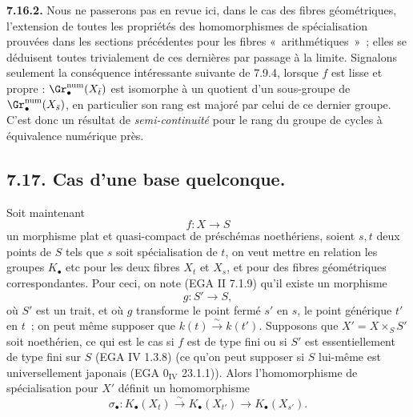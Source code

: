 
\textbf{7.16.2.}
Nous ne passerons pas en revue ici, dans le cas des fibres géométriques, l'extension de toutes les propriétés des homomorphismes de spécialisation prouvées dans les sections précédentes pour les fibres «~arithmétiques~»~; elles se déduisent toutes trivialement de ces dernières par passage à la limite. Signalons seulement la conséquence intéressante suivante de 7.9.4, lorsque \(f\) est lisse et propre : \(\Gr_\bullet^{\mathrm{num}}(X_{\bar t})\) est isomorphe à un quotient d'un sous-groupe de \(\Gr_\bullet^{\mathrm{num}}(X_{\bar s})\), en particulier son rang est majoré par celui de ce dernier groupe. C'est donc un résultat de \emph{semi-continuité} pour le rang du groupe de cycles à équivalence numérique près.

\subsection*{7.17. Cas d'une base quelconque.}
Soit maintenant
\[
  f:X\longrightarrow S
\]
un morphisme plat et quasi-compact de préschémas noethériens, soient \(s,t\) deux points de \(S\) tels que \(s\) soit spécialisation de \(t\), on veut mettre en relation les groupes \(K_\bullet\) etc pour les deux fibres \(X_t\) et \(X_s\), et pour des fibres géométriques correspondantes. Pour ceci, on note (EGA II 7.1.9) qu'il existe un morphisme
\[
  g:S'\longrightarrow S,
\]
où \(S'\) est un trait, et où \(g\) transforme le point fermé \(s'\) en \(s\), le point générique \(t'\) en \(t\)~; on peut même supposer que \(k(t)\xrightarrow{\sim}k(t')\). Supposons que \(X'=X\times_S S'\) soit noethérien, ce qui est le cas si \(f\) est de type fini ou si \(S'\) est essentiellement de type fini sur \(S\) (EGA IV 1.3.8) (ce qu'on peut supposer si \(S\) lui-même est universellement japonais (EGA \(0_{\mathrm{IV}}\) 23.1.1)). Alors l'homomorphisme de spécialisation pour \(X'\) définit un homomorphisme
\begin{equation}\tag{7.17.1}
  \sigma_\bullet:K_\bullet(X_t)\xrightarrow{\sim}K_\bullet(X_{t'})
  \longrightarrow K_\bullet(X_{s'}).
\end{equation}
